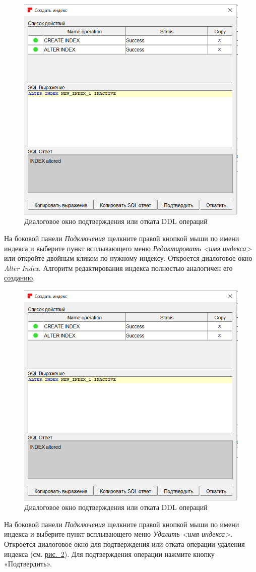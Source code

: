 \begin{figure}[H]
	\caption{Диалоговое окно подтверждения или отката DDL операций}\label{ris:01}
	\centering
	\includegraphics[width = 0.48\linewidth]{img/create_index2.png}
\end{figure}

На боковой панели \textit{Подключения} щелкните правой кнопкой мыши по имени индекса и выберите пункт всплывающего меню \textit{Редактировать <имя индекса>} или откройте двойным кликом по нужному индексу. Откроется диалоговое окно \textit{Alter Index}. Алгоритм редактирования индекса полностью аналогичен его \hyperref[sec:crind]{созданию}.

\begin{figure}[H]
	\caption{Диалоговое окно подтверждения или отката DDL операций}\label{ris:01}
	\centering
	\includegraphics[width = 0.48\linewidth]{img/create_index2.png}
\end{figure}

На боковой панели \textit{Подключения} щелкните правой кнопкой мыши по имени индекса и выберите пункт всплывающего меню \textit{Удалить <имя индекса>}. Откроется  диалоговое окно для подтверждения или отката операции удаления индекса (см. \hyperref[ris:01]{рис.~\ref{ris:01}}). Для подтверждения операции нажмите кнопку «Подтвердить».

